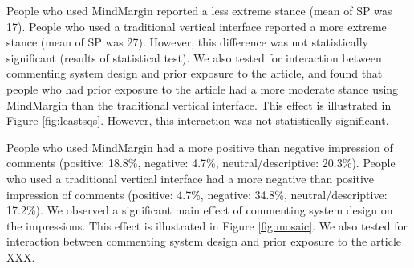 People who used MindMargin reported a less extreme stance (mean of SP was 17). People who used a traditional vertical interface reported a more extreme stance (mean of SP was 27). However, this difference was not statistically significant (results of statistical test). We also tested for interaction between commenting system design and prior exposure to the article, and found that people who had prior exposure to the article had a more moderate stance using MindMargin than the traditional vertical interface. This effect is illustrated in Figure \ref{fig:leastsqs}. However, this interaction was not statistically significant.




People who used MindMargin had a more positive than negative impression of comments (positive: 18.8\%, negative: 4.7\%, neutral/descriptive: 20.3\%). People who used a traditional vertical interface had a more negative than positive impression of comments (positive: 4.7\%, negative: 34.8\%, neutral/descriptive: 17.2\%). We observed a significant main effect of commenting system design on the impressions. This effect is illustrated in Figure \ref{fig:mosaic}. We also tested for interaction between commenting system design and prior exposure to the article XXX. 

